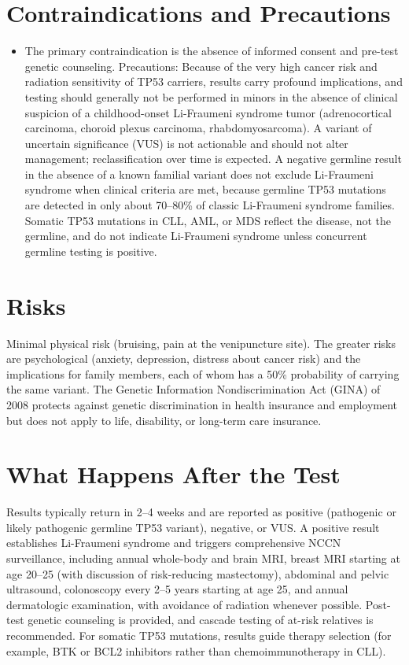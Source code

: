 \section*{Contraindications and Precautions}
\begin{itemize}
  \item The primary contraindication is the absence of informed consent and pre-test genetic counseling. Precautions: Because of the very high cancer risk and radiation sensitivity of TP53 carriers, results carry profound implications, and testing should generally not be performed in minors in the absence of clinical suspicion of a childhood-onset Li-Fraumeni syndrome tumor (adrenocortical carcinoma, choroid plexus carcinoma, rhabdomyosarcoma). A variant of uncertain significance (VUS) is not actionable and should not alter management; reclassification over time is expected. A negative germline result in the absence of a known familial variant does not exclude Li-Fraumeni syndrome when clinical criteria are met, because germline TP53 mutations are detected in only about 70--80\% of classic Li-Fraumeni syndrome families. Somatic TP53 mutations in CLL, AML, or MDS reflect the disease, not the germline, and do not indicate Li-Fraumeni syndrome unless concurrent germline testing is positive.
\end{itemize}
\section*{Risks}
Minimal physical risk (bruising, pain at the venipuncture site). The greater risks are psychological (anxiety, depression, distress about cancer risk) and the implications for family members, each of whom has a 50\% probability of carrying the same variant. The Genetic Information Nondiscrimination Act (GINA) of 2008 protects against genetic discrimination in health insurance and employment but does not apply to life, disability, or long-term care insurance.

\section*{What Happens After the Test}
Results typically return in 2--4 weeks and are reported as positive (pathogenic or likely pathogenic germline TP53 variant), negative, or VUS. A positive result establishes Li-Fraumeni syndrome and triggers comprehensive NCCN surveillance, including annual whole-body and brain MRI, breast MRI starting at age 20--25 (with discussion of risk-reducing mastectomy), abdominal and pelvic ultrasound, colonoscopy every 2--5 years starting at age 25, and annual dermatologic examination, with avoidance of radiation whenever possible. Post-test genetic counseling is provided, and cascade testing of at-risk relatives is recommended. For somatic TP53 mutations, results guide therapy selection (for example, BTK or BCL2 inhibitors rather than chemoimmunotherapy in CLL).

